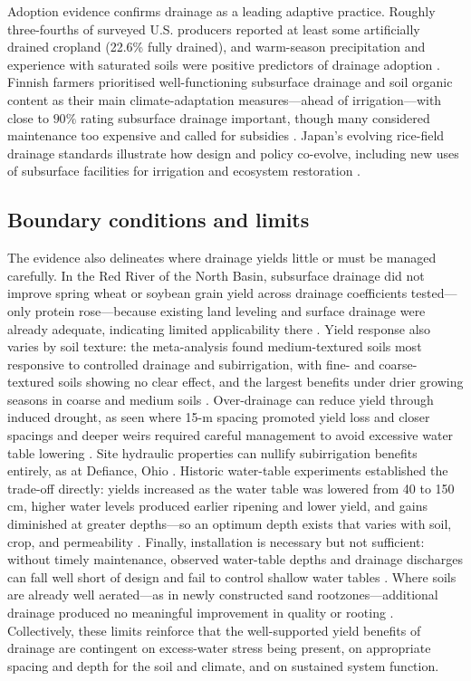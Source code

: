 Adoption evidence confirms drainage as a leading adaptive practice. Roughly three-fourths of surveyed U.S. producers reported at least some artificially drained cropland (22.6\% fully drained), and warm-season precipitation and experience with saturated soils were positive predictors of drainage adoption \parencite{Morton2015}. Finnish farmers prioritised well-functioning subsurface drainage and soil organic content as their main climate-adaptation measures—ahead of irrigation—with close to \(90\%\) rating subsurface drainage important, though many considered maintenance too expensive and called for subsidies \parencite{PeltonenSainio2021}. Japan's evolving rice-field drainage standards illustrate how design and policy co-evolve, including new uses of subsurface facilities for irrigation and ecosystem restoration \parencite{Ogino2007}.

\subsection{Boundary conditions and limits}

The evidence also delineates where drainage yields little or must be managed carefully. In the Red River of the North Basin, subsurface drainage did not improve spring wheat or soybean grain yield across drainage coefficients tested—only protein rose—because existing land leveling and surface drainage were already adequate, indicating limited applicability there \parencite{Wiersma2010}. Yield response also varies by soil texture: the meta-analysis found medium-textured soils most responsive to controlled drainage and subirrigation, with fine- and coarse-textured soils showing no clear effect, and the largest benefits under drier growing seasons in coarse and medium soils \parencite{Singh2022b}. Over-drainage can reduce yield through induced drought, as seen where 15-m spacing promoted yield loss and closer spacings and deeper weirs required careful management to avoid excessive water table lowering \parencite{Cordeiro2015,DeBoer2006}. Site hydraulic properties can nullify subirrigation benefits entirely, as at Defiance, Ohio \parencite{Gunn2018,Gunn2019}. Historic water-table experiments established the trade-off directly: yields increased as the water table was lowered from 40 to 150 cm, higher water levels produced earlier ripening and lower yield, and gains diminished at greater depths—so an optimum depth exists that varies with soil, crop, and permeability \parencite{HOOGHOUDT1952}. Finally, installation is necessary but not sufficient: without timely maintenance, observed water-table depths and drainage discharges can fall well short of design and fail to control shallow water tables \parencite{Malota2016}. Where soils are already well aerated—as in newly constructed sand rootzones—additional drainage produced no meaningful improvement in quality or rooting \parencite{Bigelow2001}. Collectively, these limits reinforce that the well-supported yield benefits of drainage are contingent on excess-water stress being present, on appropriate spacing and depth for the soil and climate, and on sustained system function.
